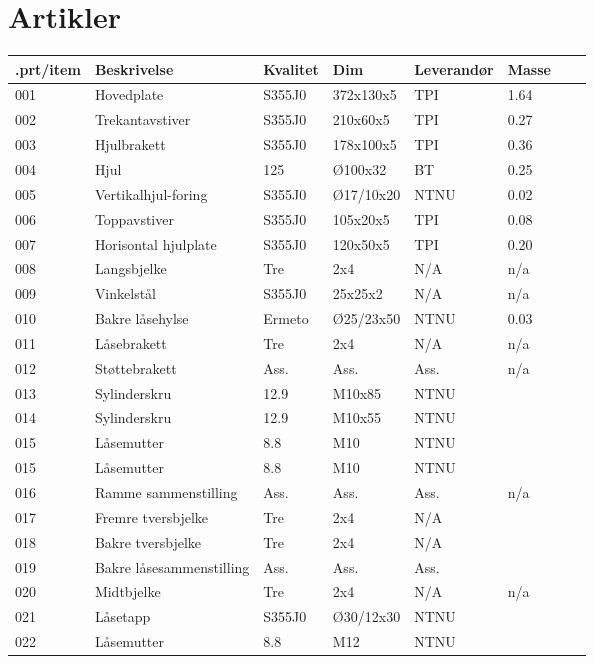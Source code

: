 \chapter{Artikler}
\begin{tabular}{|l|l|l|l|l|l|l|l|}
\hline
	.prt/item & Beskrivelse & Kvalitet & Dim & Leverandør & Masse \\ \hline
	001 & Hovedplate & S355J0 & 372x130x5 & TPI & 1.64 \\ \hline
	002 & Trekantavstiver & S355J0 & 210x60x5 & TPI & 0.27 \\ \hline
	003 & Hjulbrakett & S355J0 & 178x100x5 & TPI & 0.36 \\ \hline
	004 & Hjul & 125 & Ø100x32 & BT & 0.25 \\ \hline
	005 & Vertikalhjul-foring & S355J0 & Ø17/10x20 & NTNU & 0.02 \\ \hline
	006 & Toppavstiver & S355J0 & 105x20x5 & TPI & 0.08 \\ \hline
	007 & Horisontal hjulplate & S355J0 & 120x50x5 & TPI & 0.20 \\ \hline
	008 & Langsbjelke & Tre & 2x4 & N/A & n/a \\ \hline
	009 & Vinkelstål & S355J0 & 25x25x2 & N/A & n/a \\ \hline
	010 & Bakre låsehylse & Ermeto & Ø25/23x50 & NTNU & 0.03 \\ \hline
	011 & Låsebrakett & Tre & 2x4 & N/A & n/a \\ \hline
	012 & Støttebrakett & Ass. & Ass. & Ass. & n/a \\ \hline
	013 & Sylinderskru & 12.9 & M10x85 & NTNU &  \\ \hline
	014 & Sylinderskru & 12.9 & M10x55 & NTNU &  \\ \hline
	015 & Låsemutter & 8.8 & M10 & NTNU &  \\ \hline
	015 & Låsemutter & 8.8 & M10 & NTNU &  \\ \hline
	016 & Ramme sammenstilling & Ass. & Ass. & Ass. & n/a \\ \hline
	017 & Fremre tversbjelke & Tre & 2x4 & N/A &  \\ \hline
	018 & Bakre tversbjelke & Tre & 2x4 & N/A &  \\ \hline
	019 & Bakre låsesammenstilling & Ass. & Ass. & Ass. &  \\ \hline
	020 & Midtbjelke & Tre & 2x4 & N/A & n/a \\ \hline
	021 & Låsetapp & S355J0 & Ø30/12x30 & NTNU &  \\ \hline
	022 & Låsemutter & 8.8 & M12 & NTNU &  \\ \hline

\end{tabular}
